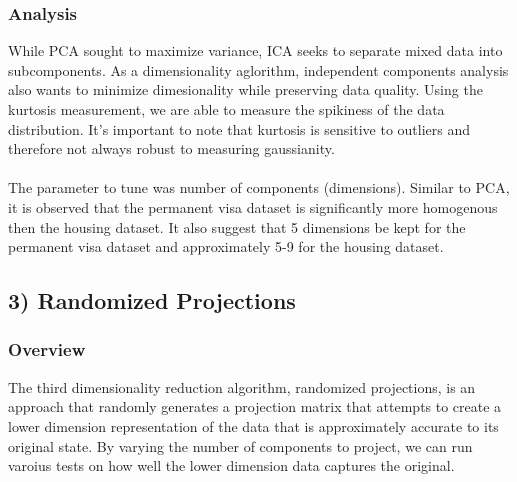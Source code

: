 \documentclass[h]{article}
\begin{document}
\subsubsection*{Analysis}
While PCA sought to maximize variance, ICA seeks to separate mixed data into 
subcomponents.  As a dimensionality aglorithm, independent components analysis also wants to minimize 
dimesionality while preserving data quality.  Using the kurtosis measurement, 
we are able to measure the spikiness of the data distribution.  It's important to note that kurtosis is 
sensitive to outliers and therefore not always robust to measuring gaussianity. 
\\ \\ 
The parameter to tune was number of components (dimensions).  Similar to PCA, it is observed that the permanent visa dataset is significantly 
more homogenous then the housing dataset.  It also suggest that 5 dimensions 
be kept for the permanent visa dataset and approximately 5-9 for the housing 
dataset.


\subsection*{3) Randomized Projections}  
\subsubsection*{Overview}
The third dimensionality reduction algorithm, randomized projections, is an 
approach that randomly generates a projection matrix that attempts to create a 
lower dimension representation of the data that is approximately accurate to 
its original state.  By varying the number of components to project, we can run 
varoius tests on how well the lower dimension data captures the original.
\end{document}
